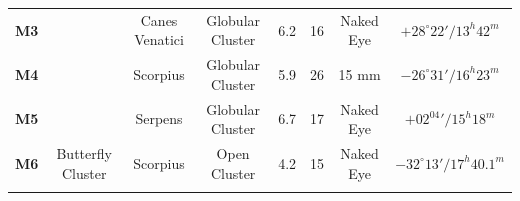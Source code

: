 \documentclass[a4paper,12pt]{extarticle}
\begin{document}
\begin{table}[H]
\begin{tabular}{cccccccc}
\rowcolor[HTML]{FFF2CC} 
\textbf{M3}                              & \multicolumn{1}{l}{\cellcolor[HTML]{FFF2CC}}                      & Canes Venatici                                & Globular Cluster                       & 6.2                                                                                           & 16                                                                                              & Naked Eye                                                                                   & $+28^\circ 22'/ 13^h 42^m$                                                                   \\
\rowcolor[HTML]{FFF2CC} 
\textbf{M4}                              & \multicolumn{1}{l}{\cellcolor[HTML]{FFF2CC}}                      & Scorpius                                      & Globular Cluster                       & 5.9                                                                                           & 26                                                                                              & 15 mm                                                                                       & $-26^\circ 31'/ 16^h 23^m$                                                                   \\
\rowcolor[HTML]{FFF2CC} 
\textbf{M5}                              & \multicolumn{1}{l}{\cellcolor[HTML]{FFF2CC}}                      & Serpens                                       & Globular Cluster                       & 6.7                                                                                           & 17                                                                                              & Naked Eye                                                                                   & $+02^ 04'/ 15^h 18^m $                                                                       \\
\rowcolor[HTML]{D9EAD3} 
\textbf{M6}                              & Butterfly Cluster                                                 & Scorpius                                      & Open Cluster                           & 4.2                                                                                           & 15                                                                                              & Naked Eye                                                                                   & $-32^\circ 13'/ 17^h 40.1^m$                                                                 \\
\rowcolor[HTML]{D9EAD3} 

\end{tabular}
\end{table}
\end{document}
